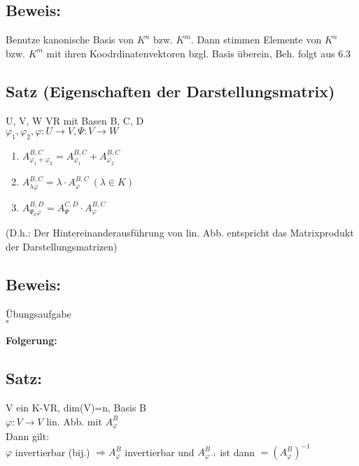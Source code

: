 \subsection*{Beweis:}
Benutze kanonische Basis von $K^n$ bzw. $K^m$. Dann stimmen Elemente von $K^n$ bzw. $K^m$ mit ihren Koodrdinatenvektoren bzgl. Basis überein, Beh. folgt aus 6.3

\subsection{Satz (Eigenschaften der Darstellungsmatrix)}
U, V, W VR mit Basen B, C, D\\
$\varphi_1,\varphi_2,\varphi: U\rightarrow V, \Psi: V\rightarrow W$
\begin{enumerate}
	\item
	$A_{\varphi_1+\varphi_2}^{B,C} = A_{\varphi_1}^{B,C} + A_{\varphi_2}^{B,C}$
	
	\item
	$A_{\lambda \varphi}^{B,C} = \lambda\cdot A_{\varphi}^{B,C} \ (\lambda\in K)$
	
	\item
	$A_{\Psi_0\varphi}^{B,D} = A_{\Psi}^{C,D}\cdot A_{\varphi}^{B,C}$
\end{enumerate}
(D.h.: Der Hintereinanderausführung von lin. Abb. entspricht das Matrixprodukt der Darstellungsmatrizen)

\subsection*{Beweis:}
Übungsaufgabe\\
\hspace*{13cm}$\square$


\textbf{Folgerung:}
\subsection{Satz:}
V ein K-VR, dim(V)=n, Basis B\\
$\varphi: V\rightarrow V$ lin. Abb. mit $A_{\varphi}^B$\\
Dann gilt:\\
$\varphi$ invertierbar (bij.) $\Rightarrow A_{\varphi}^B$ invertierbar und $A_{\varphi^{-1}}^B$ ist dann $=(A_{\varphi}^B)^{-1}$

